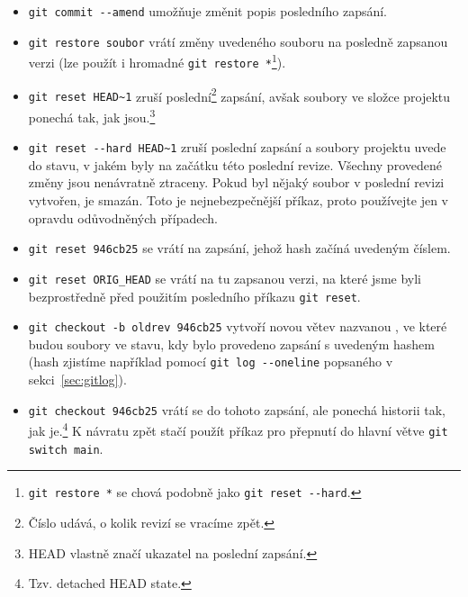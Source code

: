 \documentclass[a4paper,11pt,twoside]{article}
\def\code#1{\textnormal{\texttt{#1}}}
\theoremstyle{red}
\theoremstyle{green}
\begin{document}
    \begin{itemize}
        \item \code{git commit -{}-amend} umožňuje změnit popis posledního zapsání.
        \item \code{git restore soubor} vrátí změny uvedeného souboru na posledně zapsanou verzi (lze použít i hromadné \code{git restore *}\footnote{\code{git restore *} se chová podobně jako \code{git reset -{}-hard}.}).
        \item \code{git reset HEAD\~{}1} zruší poslední\footnote{Číslo udává, o kolik revizí se vracíme zpět.} zapsání, avšak soubory ve složce projektu ponechá tak, jak jsou.\footnote{HEAD vlastně značí ukazatel na poslední zapsání.}
        \item \code{git reset -{}-hard HEAD\~{}1} zruší poslední zapsání a soubory projektu uvede do stavu, v jakém byly na začátku této poslední revize. 
        Všechny provedené změny jsou nenávratně ztraceny.
        Pokud byl nějaký soubor v poslední revizi vytvořen, je smazán.
        Toto je nejnebezpečnější příkaz, proto používejte jen v opravdu odůvodněných případech.
        \item \code{git reset 946cb25} se vrátí na zapsání, jehož hash začíná uvedeným číslem.
        \item \code{git reset ORIG_HEAD} se vrátí na tu zapsanou verzi, na které jsme byli bezprostředně před použitím posledního příkazu \code{git reset}.
        \item \code{git checkout -b oldrev 946cb25} vytvoří novou větev nazvanou , ve které budou soubory ve stavu, kdy bylo provedeno zapsání s uvedeným hashem (hash zjistíme například pomocí \code{git log -{}-oneline} popsaného v sekci~\ref{sec:gitlog}).
        \item \code{git checkout 946cb25} vrátí se do tohoto zapsání, ale ponechá historii tak, jak je.\footnote{Tzv. detached HEAD state.}
            K návratu zpět stačí použít příkaz pro přepnutí do hlavní větve \code{git switch main}.
    \end{itemize}
\end{document}
